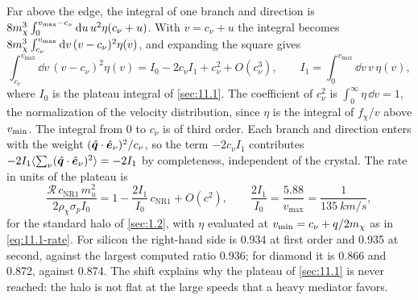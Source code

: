 Far above the edge, the integral of one branch and direction is $8m_{\chi}^3\int_0^{v_{\mathrm{max}} - c_\nu}\mathrm{d} u\,u^2\eta(c_\nu + u)$. With $v = c_\nu + u$ the integral becomes $8m_{\chi}^3\int_{c_\nu}^{v_{\mathrm{max}}}\mathrm{d} v\,(v - c_\nu)^2\eta(v)$, and expanding the square gives
\begin{equation*}
  \int_{c_\nu}^{v_{\mathrm{max}}}\dd v\,(v - c_\nu)^2\eta(v) = I_0 - 2c_\nu I_1 + c_\nu^2 + O(c_\nu^3) ,
  \qquad
  I_1 = \int_0^{v_{\mathrm{max}}}\dd v\,v\,\eta(v) ,
\end{equation*}
where $I_0$ is the plateau integral of \cref{sec:11.1}. The coefficient of $c_\nu^2$ is $\int_0^\infty\eta\,\dd v = 1$, the normalization of the velocity distribution, since $\eta$ is the integral of $f_\chi/v$ above $v_{\mathrm{min}}$. The integral from $0$ to $c_\nu$ is of third order. Each branch and direction enters with the weight $(\hat{\bm{q}}\cdot\hat{\bm{e}}_\nu)^2/c_\nu$, so the term $-2c_\nu I_1$ contributes $-2I_1\langle\sum_\nu(\hat{\bm{q}}\cdot\hat{\bm{e}}_\nu)^2\rangle = -2I_1$ by completeness, independent of the crystal. The rate in units of the plateau is
\begin{equation}
  \frac{\mathcal{R}\,c_{\mathrm{NR1}}\,m_u^2}{2\rho_\chi\sigma_pI_0} = 1 - \frac{2I_1}{I_0}\,c_{\mathrm{NR1}} + O(c^2) ,
  \qquad
  \frac{2I_1}{I_0} = \frac{5.88}{v_{\mathrm{max}}} = \frac{1}{\SI{135}{km/s}} ,
  \label{eq:17.5-shift}
\end{equation}
for the standard halo of \cref{sec:1.2}, with $\eta$ evaluated at $v_{\mathrm{min}} = c_\nu + q/2m_{\chi}$ as in \cref{eq:11.1-rate}. For silicon the right-hand side is 0.934 at first order and 0.935 at second, against the largest computed ratio 0.936; for diamond it is 0.866 and 0.872, against 0.874. The shift explains why the plateau of \cref{sec:11.1} is never reached: the halo is not flat at the large speeds that a heavy mediator favors.

